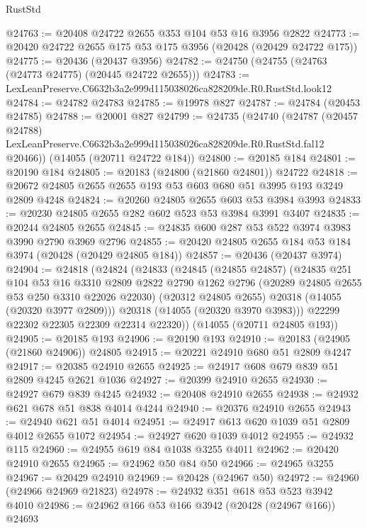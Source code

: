 \begin{lexlean}{RustStd}
\begin{coremodule}
@24763 := @20408 @24722 @2655 @353 @104 @53 @16 @3956 @2822
@24773 := @20420 @24722 @2655 @175 @53 @175 @3956 (@20428 (@20429 @24722 @175))
@24775 := @20436 (@20437 @3956)
@24782 := @24750 (@24755 (@24763 (@24773 @24775) (@20445 @24722 @2655)))
@24783 := LexLeanPreserve.C6632b3a2e999d115038026ca828209de.R0.RustStd.look12
@24784 := @24782 @24783
@24785 := @19978 @827
@24787 := @24784 (@20453 @24785)
@24788 := @20001 @827
@24799 := @24735
    (@24740
      (@24787
        (@20457 @24788)
        LexLeanPreserve.C6632b3a2e999d115038026ca828209de.R0.RustStd.fal12
        @20466))
    (@14055 (@20711 @24722 @184))
@24800 := @20185 @184
@24801 := @20190 @184
@24805 := @20183 (@24800 (@21860 @24801)) @24722
@24818 := @20672 @24805 @2655 @2655 @193 @53 @603 @680 @51 @3995 @193 @3249 @2809 @4248
@24824 := @20260 @24805 @2655 @603 @53 @3984 @3993
@24833 := @20230 @24805 @2655 @282 @602 @523 @53 @3984 @3991 @3407
@24835 := @20244 @24805 @2655
@24845 := @24835 @600 @287 @53 @522 @3974 @3983 @3990 @2790 @3969 @2796
@24855 := @20420 @24805 @2655 @184 @53 @184 @3974 (@20428 (@20429 @24805 @184))
@24857 := @20436 (@20437 @3974)
@24904 := @24818
    (@24824
      (@24833
        (@24845
          (@24855 @24857)
          (@24835
            @251
            @104
            @53
            @16
            @3310
            @2809
            @2822
            @2790
            @1262
            @2796
            (@20289 @24805 @2655 @53 @250 @3310 @22026 @22030)
            (@20312 @24805 @2655)
            @20318
            (@14055 (@20320 @3977 @2809)))
          @20318
          (@14055 (@20320 @3970 @3983)))
        @22299
        @22302
        @22305
        @22309
        @22314
        @22320))
    (@14055 (@20711 @24805 @193))
@24905 := @20185 @193
@24906 := @20190 @193
@24910 := @20183 (@24905 (@21860 @24906)) @24805
@24915 := @20221 @24910 @680 @51 @2809 @4247
@24917 := @20385 @24910 @2655
@24925 := @24917 @608 @679 @839 @51 @2809 @4245 @2621 @1036
@24927 := @20399 @24910 @2655
@24930 := @24927 @679 @839 @4245
@24932 := @20408 @24910 @2655
@24938 := @24932 @621 @678 @51 @838 @4014 @4244
@24940 := @20376 @24910 @2655
@24943 := @24940 @621 @51 @4014
@24951 := @24917 @613 @620 @1039 @51 @2809 @4012 @2655 @1072
@24954 := @24927 @620 @1039 @4012
@24955 := @24932 @115
@24960 := @24955 @619 @84 @1038 @3255 @4011
@24962 := @20420 @24910 @2655
@24965 := @24962 @50 @84 @50
@24966 := @24965 @3255
@24967 := @20429 @24910
@24969 := @20428 (@24967 @50)
@24972 := @24960 (@24966 @24969 @21823)
@24978 := @24932 @351 @618 @53 @523 @3942 @4010
@24986 := @24962 @166 @53 @166 @3942 (@20428 (@24967 @166)) @24693

\end{coremodule}
\end{lexlean}
